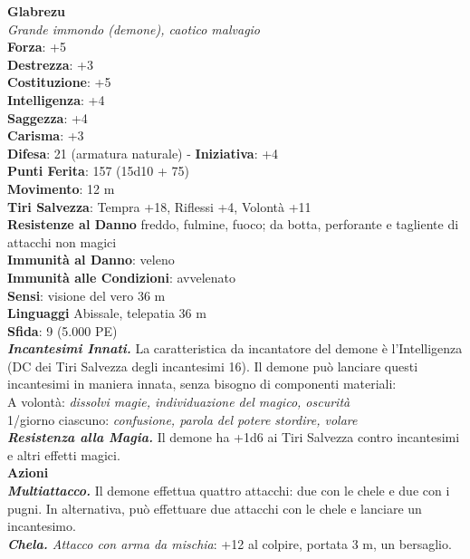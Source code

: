 \begin{multicols}{2}
\medskip\textbf{Glabrezu}\\
\emph{Grande immondo (demone), caotico malvagio}\\
\textbf{Forza}: +5\\
\textbf{Destrezza}: +3\\
\textbf{Costituzione}: +5\\
\textbf{Intelligenza}: +4\\
\textbf{Saggezza}: +4\\
\textbf{Carisma}: +3\\
\textbf{Difesa}: 21 (armatura naturale) - \textbf{Iniziativa}: +4\\
\textbf{Punti Ferita}: 157 (15d10 + 75)\\
\textbf{Movimento}: 12 m\\
\textbf{Tiri Salvezza}: Tempra +18, Riflessi +4, Volontà +11\\
\textbf{Resistenze al Danno} freddo, fulmine, fuoco; da botta, perforante e tagliente di attacchi non magici\\
\textbf{Immunità al Danno}: veleno\\
\textbf{Immunità alle Condizioni}: avvelenato\\
\textbf{Sensi}: visione del vero 36 m\\
\textbf{Linguaggi} Abissale, telepatia 36 m \\
\textbf{Sfida}: 9 (5.000 PE)\smallskip\\
\emph{\textbf{Incantesimi Innati.}} La caratteristica da incantatore del demone è l'Intelligenza (DC dei Tiri Salvezza degli incantesimi 16). Il demone può lanciare questi incantesimi in maniera innata, senza bisogno di componenti materiali:\\
A volontà: \emph{dissolvi magie, individuazione del magico, oscurità}\\
1/giorno ciascuno: \emph{confusione, parola del potere stordire, volare}\\
\emph{\textbf{Resistenza alla Magia.}} Il demone ha +1d6 ai Tiri Salvezza contro  incantesimi e altri effetti magici. \\
\smallskip\textbf{Azioni}\\
\emph{\textbf{Multiattacco.}} Il demone effettua quattro attacchi: due con le chele e due con i pugni. In alternativa, può effettuare due attacchi con le chele e lanciare un incantesimo.\\
\emph{\textbf{Chela.} Attacco con arma da mischia}: +12 al colpire, portata 3 m, un bersaglio.\\

\end{multicols}
